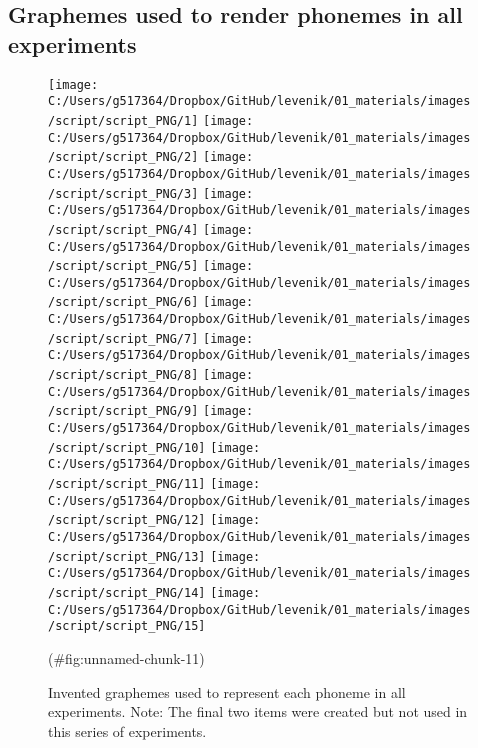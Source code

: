 \clearpage



\begin{appendix}
\section{}
\subsection{Graphemes used to render phonemes in all
experiments}\label{appendix-a}

\begin{figure}[htb]

{\centering \texttt{[image: C:/Users/g517364/Dropbox/GitHub/levenik/01\_materials/images/script/script\_PNG/1]} \texttt{[image: C:/Users/g517364/Dropbox/GitHub/levenik/01\_materials/images/script/script\_PNG/2]} \texttt{[image: C:/Users/g517364/Dropbox/GitHub/levenik/01\_materials/images/script/script\_PNG/3]} \texttt{[image: C:/Users/g517364/Dropbox/GitHub/levenik/01\_materials/images/script/script\_PNG/4]} \texttt{[image: C:/Users/g517364/Dropbox/GitHub/levenik/01\_materials/images/script/script\_PNG/5]} \texttt{[image: C:/Users/g517364/Dropbox/GitHub/levenik/01\_materials/images/script/script\_PNG/6]} \texttt{[image: C:/Users/g517364/Dropbox/GitHub/levenik/01\_materials/images/script/script\_PNG/7]} \texttt{[image: C:/Users/g517364/Dropbox/GitHub/levenik/01\_materials/images/script/script\_PNG/8]} \texttt{[image: C:/Users/g517364/Dropbox/GitHub/levenik/01\_materials/images/script/script\_PNG/9]} \texttt{[image: C:/Users/g517364/Dropbox/GitHub/levenik/01\_materials/images/script/script\_PNG/10]} \texttt{[image: C:/Users/g517364/Dropbox/GitHub/levenik/01\_materials/images/script/script\_PNG/11]} \texttt{[image: C:/Users/g517364/Dropbox/GitHub/levenik/01\_materials/images/script/script\_PNG/12]} \texttt{[image: C:/Users/g517364/Dropbox/GitHub/levenik/01\_materials/images/script/script\_PNG/13]} \texttt{[image: C:/Users/g517364/Dropbox/GitHub/levenik/01\_materials/images/script/script\_PNG/14]} \texttt{[image: C:/Users/g517364/Dropbox/GitHub/levenik/01\_materials/images/script/script\_PNG/15]} 

}

\caption{Invented graphemes used to represent each phoneme in all experiments. Note: The final two items were created but not used in this series of experiments.}(\#fig:unnamed-chunk-11)
\end{figure}
\end{appendix}
